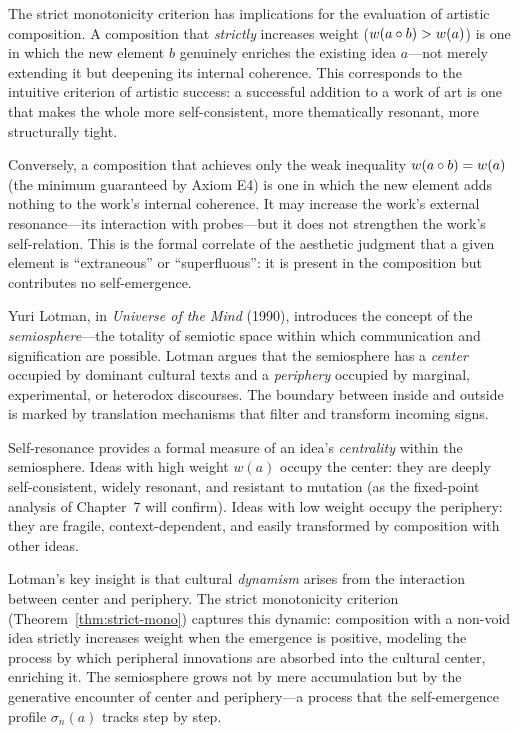 \begin{remark}\label{rem:ch3:artistic_success}
The strict monotonicity criterion has implications for the evaluation of
artistic composition. A composition that \emph{strictly} increases weight
($w(a \circ b) > w(a)$) is one in which the new element $b$ genuinely
enriches the existing idea $a$---not merely extending it but deepening its
internal coherence. This corresponds to the intuitive criterion of artistic
success: a successful addition to a work of art is one that makes the
whole more self-consistent, more thematically resonant, more structurally
tight.

Conversely, a composition that achieves only the weak inequality
$w(a \circ b) = w(a)$ (the minimum guaranteed by Axiom E4) is one in
which the new element adds nothing to the work's internal coherence. It
may increase the work's external resonance---its interaction with
probes---but it does not strengthen the work's self-relation. This is
the formal correlate of the aesthetic judgment that a given element is
``extraneous'' or ``superfluous'': it is present in the composition but
contributes no self-emergence.
\end{remark}

\begin{interpretation}\label{interp:ch3:lotman_semiosphere}
Yuri Lotman, in \emph{Universe of the Mind} (1990), introduces the concept
of the \emph{semiosphere}---the totality of semiotic space within which
communication and signification are possible. Lotman argues that the
semiosphere has a \emph{center} occupied by dominant cultural texts and a
\emph{periphery} occupied by marginal, experimental, or heterodox
discourses. The boundary between inside and outside is marked by
translation mechanisms that filter and transform incoming signs.

Self-resonance provides a formal measure of an idea's \emph{centrality}
within the semiosphere. Ideas with high weight $w(a)$ occupy the center:
they are deeply self-consistent, widely resonant, and resistant to mutation
(as the fixed-point analysis of Chapter~7 will confirm). Ideas with low
weight occupy the periphery: they are fragile, context-dependent, and
easily transformed by composition with other ideas.

Lotman's key insight is that cultural \emph{dynamism} arises from the
interaction between center and periphery. The strict monotonicity criterion
(Theorem~\ref{thm:strict-mono}) captures this dynamic: composition with a
non-void idea strictly increases weight when the emergence is positive,
modeling the process by which peripheral innovations are absorbed into the
cultural center, enriching it. The semiosphere grows not by mere
accumulation but by the generative encounter of center and periphery---a
process that the self-emergence profile $\sigma_n(a)$ tracks step by step.
\end{interpretation}


